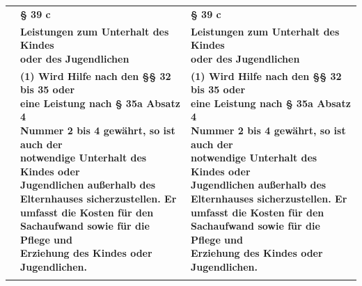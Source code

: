 \documentclass[10pt,a4paper,landscape]{article}
\begin{document}
\begin{longtable}{|L{8.2cm}|L{8.2cm}|L{8.2cm}|}
\hhline{|---|}
 & \textbf{\S{} 39 c } & \textbf{\S{} 39 c } \\
\hhline{|---|}
 & \textbf{Leistungen zum Unterhalt des Kindes  \newline oder des Jugendlichen } & \textbf{Leistungen zum Unterhalt des Kindes  \newline oder des Jugendlichen } \\
\hhline{|---|}
 & \textbf{(1) Wird Hilfe nach den \S{}\S{} 32 bis 35 oder  \newline eine Leistung nach \S{} 35a Absatz 4  \newline Nummer 2 bis 4 gewährt, so ist auch der  \newline notwendige Unterhalt des Kindes oder  \newline Jugendlichen außerhalb des  \newline Elternhauses sicherzustellen. Er  \newline umfasst die Kosten für den  \newline Sachaufwand sowie für die Pflege und  \newline Erziehung des Kindes oder  \newline Jugendlichen. } & \textbf{(1) Wird Hilfe nach den \S{}\S{} 32 bis 35 oder  \newline eine Leistung nach \S{} 35a Absatz 4  \newline Nummer 2 bis 4 gewährt, so ist auch der  \newline notwendige Unterhalt des Kindes oder  \newline Jugendlichen außerhalb des  \newline Elternhauses sicherzustellen. Er  \newline umfasst die Kosten für den  \newline Sachaufwand sowie für die Pflege und  \newline Erziehung des Kindes oder  \newline Jugendlichen. } \\
\hhline{|---|}

\end{longtable}
\end{document}
